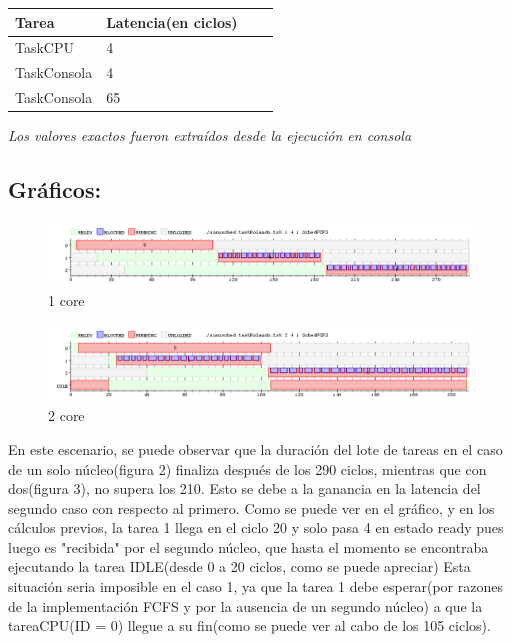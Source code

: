 \documentclass[10pt, a4paper]{article}
\begin{document}
\begin{center}
\begin{tabular}{| l | l | l | l |}
    \hline
    Tarea & Latencia(en ciclos)\\ \hline
   TaskCPU &	4 \\ \hline 
   TaskConsola & 4 \\ \hline
TaskConsola & 65 \\ \hline
\end{tabular}
\end{center}
\begin{center}
  \textit{Los valores exactos fueron extraídos desde la ejecución en consola}
\end{center}

\subsection{Gráficos:}

\begin{figure}[H]
  	\centering
   	\includegraphics[width=1\textwidth]
   	 {imgs/Rolando1Core.png}
	\caption{1 core}
\end{figure}

\begin{figure}[H]
  	\centering
   	\includegraphics[width=1\textwidth]
   	 {imgs/Rolando2Core.png}
	\caption{2 core}
\end{figure}


En este escenario, se puede observar que la duración del lote de tareas en el caso de un solo núcleo(figura 2) finaliza después de los 290 ciclos, mientras que con dos(figura 3), no supera los 210. 
Esto se debe a la ganancia en la latencia del segundo caso con respecto al primero. Como se puede ver en el gráfico, y en los cálculos previos, la tarea 1 llega en el ciclo 20  y solo pasa 4 en estado ready pues luego es "recibida" por el segundo núcleo, que hasta el momento se encontraba ejecutando la tarea IDLE(desde 0 a 20 ciclos, como se puede apreciar)
Esta situación seria imposible en el caso 1, ya que la tarea 1 debe esperar(por razones de la implementación FCFS y por la ausencia de un segundo núcleo) a que la tareaCPU(ID = 0) llegue a su fin(como se puede ver al cabo de los 105 ciclos). \\
\end{document}
